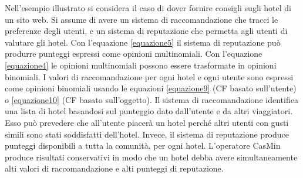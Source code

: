 \documentclass{report}
\begin{document}
\begin{table}[htbp]
	\caption[Esempio 1 - Risultato CasMin con opinioni multinomiali]{Esempio 1 - Risultato CasMin con opinioni multinomiali}
\end{table}
	
	Nell'esempio illustrato si considera il caso di dover fornire consigli
	sugli hotel di un sito web. Si assume di avere un sistema di
	raccomandazione che tracci le preferenze degli utenti, e un sistema di
	reputazione che permetta agli utenti di valutare gli hotel. Con l'equazione \eqref{equazione5} il sistema di reputazione può produrre
	punteggi espressi come opinioni multinomiali. Con l'equazione \eqref{equazione4} le opinioni multinomiali possono essere trasformate in
	opinioni binomiali. I valori di raccomandazione per ogni hotel e ogni
	utente sono espressi come opinioni binomiali usando le equazioni
	\eqref{equazione9} (CF basato sull'utente) o \eqref{equazione10} (CF basato sull'oggetto). Il sistema di raccomandazione identifica una
	lista di hotel basandosi sul punteggio dato dall'utente e da altri
	viaggiatori. Esso può prevedere che all'utente piacerà un hotel perché
	altri utenti con gusti simili sono stati soddisfatti dell'hotel. Invece,
	il sistema di reputazione produce punteggi disponibili a tutta la
	comunità, per ogni hotel. L'operatore CasMin produce risultati
	conservativi in modo che un hotel debba avere simultaneamente alti
	valori di raccomandazione e alti punteggi di reputazione. 
	
\end{document}
